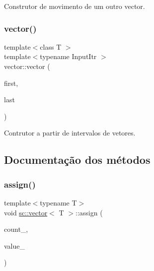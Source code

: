 Construtor de movimento de um outro vector. 

\mbox{\label{classsc_1_1vector_af271ce749db30ebfaf317330e5b1de8c}} 
\subsubsection{\texorpdfstring{vector()}{vector()}\hspace{0.1cm}{\footnotesize\ttfamily [5/5]}}
{\footnotesize\ttfamily template$<$class T $>$ \\
template$<$typename Input\+Itr $>$ \\
vector\+::vector (\begin{DoxyParamCaption}\item[{Input\+Itr}]{first,  }\item[{Input\+Itr}]{last }\end{DoxyParamCaption})}



Contrutor a partir de intervalos de vetores. 



\subsection{Documentação dos métodos}
\mbox{\label{classsc_1_1vector_a6295cd66e564a954bc384fc016dc80a0}} 
\subsubsection{\texorpdfstring{assign()}{assign()}\hspace{0.1cm}{\footnotesize\ttfamily [1/4]}}
{\footnotesize\ttfamily template$<$typename T$>$ \\
void \hyperlink{classsc_1_1vector}{sc\+::vector}$<$ T $>$\+::assign (\begin{DoxyParamCaption}\item[{\hyperlink{classsc_1_1vector_a48bf37ba1a6d0c13504414d86e27c399}{size\+\_\+type}}]{count\+\_\+,  }\item[{\hyperlink{classsc_1_1vector_a8da2b1a11b069241100f9b2e14f481a0}{const\+\_\+reference}}]{value\+\_\+ }\end{DoxyParamCaption})}



